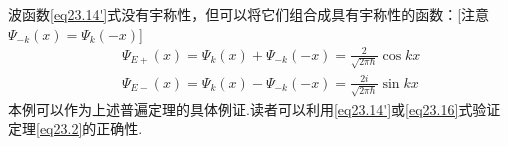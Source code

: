 波函数\eqref{eq23.14'}式没有宇称性，但可以将它们组合成具有宇称性的函数：[注意$\varPsi_{-k}(x)=\varPsi_{k}(-x)$]
\begin{equation} \label{eq23.16}
	\begin{aligned} 
	&& \varPsi_{E+}(x)=\varPsi_{k}(x)+\varPsi_{-k}(-x)=\frac{2}{\sqrt{2\pi\hbar}}\cos kx	\\
	&& \varPsi_{E-}(x)=\varPsi_{k}(x)-\varPsi_{-k}(-x)=\frac{2i}{\sqrt{2\pi\hbar}}\sin kx
	\end{aligned}
\end{equation}\eqnormal
本例可以作为上述普遍定理的具体例证.读者可以利用\eqref{eq23.14'}或\eqref{eq23.16}式验证定理\eqref{eq23.2}的正确性.











